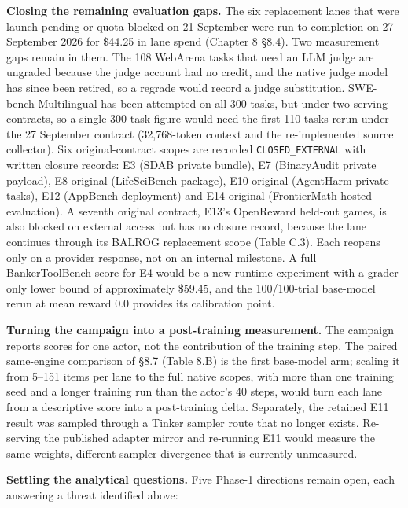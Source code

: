 \documentclass[12pt,a4paper]{report}
\begin{document}
\textbf{Closing the remaining evaluation gaps.} The six replacement
lanes that were launch-pending or quota-blocked on 21 September were run
to completion on 27 September 2026 for \$44.25 in lane spend (Chapter 8
§8.4). Two measurement gaps remain in them. The 108 WebArena tasks that
need an LLM judge are ungraded because the judge account had no credit,
and the native judge model has since been retired, so a regrade would
record a judge substitution. SWE-bench Multilingual has been attempted
on all 300 tasks, but under two serving contracts, so a single 300-task
figure would need the first 110 tasks rerun under the 27 September
contract (32,768-token context and the re-implemented source collector).
Six original-contract scopes are recorded \texttt{CLOSED\_EXTERNAL} with
written closure records: E3 (SDAB private bundle), E7 (BinaryAudit
private payload), E8-original (LifeSciBench package), E10-original
(AgentHarm private tasks), E12 (AppBench deployment) and E14-original
(FrontierMath hosted evaluation). A seventh original contract, E13's
OpenReward held-out games, is also blocked on external access but has no
closure record, because the lane continues through its BALROG
replacement scope (Table C.3). Each reopens only on a provider response,
not on an internal milestone. A full BankerToolBench score for E4 would
be a new-runtime experiment with a grader-only lower bound of
approximately \$59.45, and the 100/100-trial base-model rerun at mean
reward 0.0 provides its calibration point.

\textbf{Turning the campaign into a post-training measurement.} The
campaign reports scores for one actor, not the contribution of the
training step. The paired same-engine comparison of §8.7 (Table 8.B) is
the first base-model arm; scaling it from 5--151 items per lane to the
full native scopes, with more than one training seed and a longer
training run than the actor's 40 steps, would turn each lane from a
descriptive score into a post-training delta. Separately, the retained
E11 result was sampled through a Tinker sampler route that no longer
exists. Re-serving the published adapter mirror and re-running E11 would
measure the same-weights, different-sampler divergence that is currently
unmeasured.

\textbf{Settling the analytical questions.} Five Phase-1 directions
remain open, each answering a threat identified above:
\end{document}
